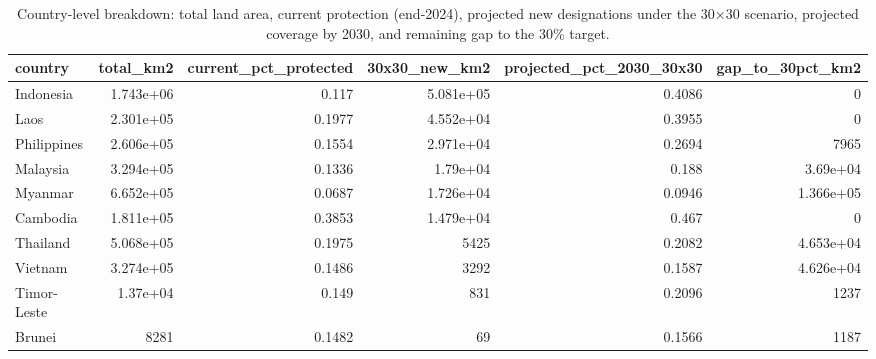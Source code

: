 \begin{table}
\caption{Country-level breakdown: total land area, current protection (end-2024), projected new designations under the 30×30 scenario, projected coverage by 2030, and remaining gap to the 30\% target.}
\label{tab:forward_country}
\begin{tabular}{lrrrrr}
\toprule
country & total_km2 & current_pct_protected & 30x30_new_km2 & projected_pct_2030_30x30 & gap_to_30pct_km2 \\
\midrule
Indonesia & 1.743e+06 & 0.117 & 5.081e+05 & 0.4086 & 0 \\
Laos & 2.301e+05 & 0.1977 & 4.552e+04 & 0.3955 & 0 \\
Philippines & 2.606e+05 & 0.1554 & 2.971e+04 & 0.2694 & 7965 \\
Malaysia & 3.294e+05 & 0.1336 & 1.79e+04 & 0.188 & 3.69e+04 \\
Myanmar & 6.652e+05 & 0.0687 & 1.726e+04 & 0.0946 & 1.366e+05 \\
Cambodia & 1.811e+05 & 0.3853 & 1.479e+04 & 0.467 & 0 \\
Thailand & 5.068e+05 & 0.1975 & 5425 & 0.2082 & 4.653e+04 \\
Vietnam & 3.274e+05 & 0.1486 & 3292 & 0.1587 & 4.626e+04 \\
Timor-Leste & 1.37e+04 & 0.149 & 831 & 0.2096 & 1237 \\
Brunei & 8281 & 0.1482 & 69 & 0.1566 & 1187 \\
\bottomrule
\end{tabular}
\end{table}
